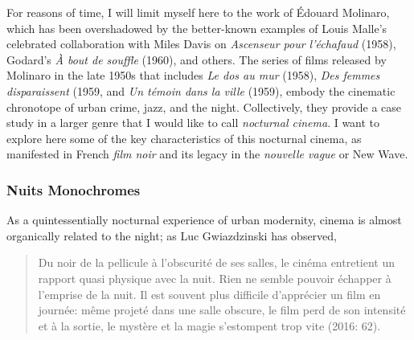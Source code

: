 \documentclass[
  letterpaper,
  DIV=11,
  numbers=noendperiod,
  oneside]{scrartcl}
\begin{document}
\marginnote{\begin{footnotesize}

\end{footnotesize}}

For reasons of time, I will limit myself here to the work of Édouard
Molinaro, which has been overshadowed by the better-known examples of
Louis Malle's celebrated collaboration with Miles Davis on
\emph{Ascenseur pour l'échafaud} (1958), Godard's \emph{À bout de
souffle} (1960), and others. The series of films released by Molinaro in
the late 1950s that includes \emph{Le dos au mur} (1958), \emph{Des
femmes disparaissent} (1959, and \emph{Un témoin dans la ville} (1959),
embody the cinematic chronotope of urban crime, jazz, and the night.
Collectively, they provide a case study in a larger genre that I would
like to call \emph{nocturnal cinema}. I want to explore here some of the
key characteristics of this nocturnal cinema, as manifested in French
\emph{film noir} and its legacy in the \emph{nouvelle vague} or New
Wave.

\subsubsection{Nuits Monochromes}\label{nuits-monochromes}

As a quintessentially nocturnal experience of urban modernity, cinema is
almost organically related to the night; as Luc Gwiazdzinski has
observed,

\begin{quote}
Du noir de la pellicule à l'obscurité de ses salles, le cinéma
entretient un rapport quasi physique avec la
nuit.{} Rien ne semble pouvoir échapper à l'emprise
de la nuit. Il est souvent plus difficile d'apprécier un film en
journée: même projeté dans une salle obscure, le film perd de son
intensité et à la sortie, le mystère et la magie s'estompent trop vite
(2016: 62).
\end{quote}
\end{document}
